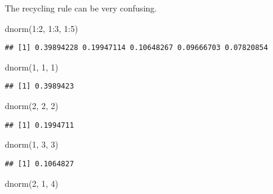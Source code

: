\documentclass[
]{article}
\newenvironment{Shaded}{\begin{snugshade}}{\end{snugshade}}
\newcommand{\DecValTok}[1]{\textcolor[rgb]{0.00,0.00,0.81}{#1}}
\newcommand{\FunctionTok}[1]{\textcolor[rgb]{0.00,0.00,0.00}{#1}}
\newcommand{\NormalTok}[1]{#1}
\newcommand{\SpecialCharTok}[1]{\textcolor[rgb]{0.00,0.00,0.00}{#1}}
\begin{document}
The recycling rule can be very confusing.

\begin{Shaded}
\begin{Highlighting}[]
\FunctionTok{dnorm}\NormalTok{(}\DecValTok{1}\SpecialCharTok{:}\DecValTok{2}\NormalTok{, }\DecValTok{1}\SpecialCharTok{:}\DecValTok{3}\NormalTok{, }\DecValTok{1}\SpecialCharTok{:}\DecValTok{5}\NormalTok{)}
\end{Highlighting}
\end{Shaded}

\begin{verbatim}
## [1] 0.39894228 0.19947114 0.10648267 0.09666703 0.07820854
\end{verbatim}

\begin{Shaded}
\begin{Highlighting}[]
\FunctionTok{dnorm}\NormalTok{(}\DecValTok{1}\NormalTok{, }\DecValTok{1}\NormalTok{, }\DecValTok{1}\NormalTok{)}
\end{Highlighting}
\end{Shaded}

\begin{verbatim}
## [1] 0.3989423
\end{verbatim}

\begin{Shaded}
\begin{Highlighting}[]
\FunctionTok{dnorm}\NormalTok{(}\DecValTok{2}\NormalTok{, }\DecValTok{2}\NormalTok{, }\DecValTok{2}\NormalTok{)}
\end{Highlighting}
\end{Shaded}

\begin{verbatim}
## [1] 0.1994711
\end{verbatim}

\begin{Shaded}
\begin{Highlighting}[]
\FunctionTok{dnorm}\NormalTok{(}\DecValTok{1}\NormalTok{, }\DecValTok{3}\NormalTok{, }\DecValTok{3}\NormalTok{)}
\end{Highlighting}
\end{Shaded}

\begin{verbatim}
## [1] 0.1064827
\end{verbatim}

\begin{Shaded}
\begin{Highlighting}[]
\FunctionTok{dnorm}\NormalTok{(}\DecValTok{2}\NormalTok{, }\DecValTok{1}\NormalTok{, }\DecValTok{4}\NormalTok{)}
\end{Highlighting}
\end{Shaded}
\end{document}

